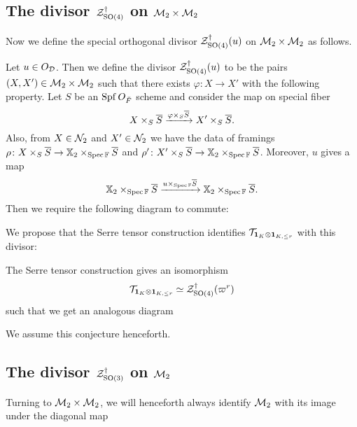 \subsection{The divisor $\mathcal Z^{\dagger}_{\operatorname{SO}(4)}$ on $\mathcal M_2 \times \mathcal M_2$}
Now we define the special orthogonal divisor $\mathcal Z^{\dagger}_{\operatorname{SO}(4)}(u)$
on $\mathcal M_2 \times \mathcal M_2$ as follows.
\begin{definition}
  Let $u \in O_\mathcal D$.
  Then we define the divisor $\mathcal Z^{\dagger}_{\operatorname{SO}(4)}(u)$ to be the pairs $(X, X') \in \mathcal M_2 \times \mathcal M_2$
  such that there exists $\varphi \colon X \to X'$ with the following property.
  Let $S$ be an $\operatorname{Spf} O_{\breve F}$ scheme and consider the map on special fiber
  \[ X \times_S \overline S \xrightarrow{\varphi \times_S \overline S} X' \times_S \overline S. \]
  Also, from $X \in \mathcal N_2$ and $X' \in \mathcal N_2$ we have the data of framings
  $\rho \colon X \times_S \overline S \to \mathbb X_2 \times_{\operatorname{Spec} \mathbb F} \overline S$
  and $\rho' \colon X' \times_S \overline S \to \mathbb X_2 \times_{\operatorname{Spec} \mathbb F} \overline S$.
  Moreover, $u$ gives a map
  \[
    \mathbb X_2 \times_{\operatorname{Spec} \mathbb F} \overline S
    \xrightarrow{u \times _{\operatorname{Spec} \mathbb F} \overline S}
    \mathbb X_2 \times_{\operatorname{Spec} \mathbb F} \overline S.
  \]
  Then we require the following diagram to commute:
  \begin{center}
  \end{center}
\end{definition}
We propose that the Serre tensor construction identifies $\mathcal{T}_{\mathbf{1}_K \otimes \mathbf{1}_{K, \le r}}$ with this divisor:
\begin{conjecture}
  \label{conj:serre_pullback_space}
  The Serre tensor construction gives an isomorphism
  \[ \mathcal{T}_{\mathbf{1}_K \otimes \mathbf{1}_{K, \le r}} \simeq \mathcal Z^{\dagger}_{\operatorname{SO}(4)}(\varpi^r) \]
  such that we get an analogous diagram
  \begin{center}
  \end{center}
\end{conjecture}
We assume this conjecture henceforth.

\subsection{The divisor $\mathcal Z^{\dagger}_{\operatorname{SO}(3)}$ on $\mathcal M_2$}
Turning to $\mathcal M_2 \times \mathcal M_2$, we will henceforth always identify $\mathcal M_2$
with its image under the diagonal map
\begin{center}
\end{center}

